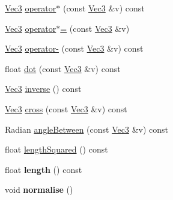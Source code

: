 \begin{DoxyCompactItemize}
\item 
\hyperlink{class_verdi_1_1_vec3}{\-Vec3} \hyperlink{class_verdi_1_1_vec3_aced0b24405adb8f7c75f7387adbd2e91}{operator$\ast$} (const \hyperlink{class_verdi_1_1_vec3}{\-Vec3} \&v) const 
\item 
\hyperlink{class_verdi_1_1_vec3}{\-Vec3} \hyperlink{class_verdi_1_1_vec3_a47b6e80a757cdb340b0e646aa9dd4636}{operator$\ast$=} (const \hyperlink{class_verdi_1_1_vec3}{\-Vec3} \&v)
\item 
\hyperlink{class_verdi_1_1_vec3}{\-Vec3} \hyperlink{class_verdi_1_1_vec3_a542c813d0357811c9cc78ace1f7754be}{operator-\/} (const \hyperlink{class_verdi_1_1_vec3}{\-Vec3} \&v) const 
\item 
float \hyperlink{class_verdi_1_1_vec3_a9704f2bf4f05943c9349806a3ef5cb28}{dot} (const \hyperlink{class_verdi_1_1_vec3}{\-Vec3} \&v) const 
\item 
\hyperlink{class_verdi_1_1_vec3}{\-Vec3} \hyperlink{class_verdi_1_1_vec3_a65d9be9038a82415adf94d84daea05fa}{inverse} () const 
\item 
\hyperlink{class_verdi_1_1_vec3}{\-Vec3} \hyperlink{class_verdi_1_1_vec3_a043f7130e4c642fc8cb922c49bfa8624}{cross} (const \hyperlink{class_verdi_1_1_vec3}{\-Vec3} \&v) const 
\item 
\-Radian \hyperlink{class_verdi_1_1_vec3_a95102441017d6df813e631d40951c2d8}{angle\-Between} (const \hyperlink{class_verdi_1_1_vec3}{\-Vec3} \&v) const 
\item 
float \hyperlink{class_verdi_1_1_vec3_ad0b20602d296ca1b994fb879cc2b0ab8}{length\-Squared} () const 
\item 
\hypertarget{class_verdi_1_1_vec3_aa9743884e05808196c05514efe47d888}{float {\bfseries length} () const }\label{class_verdi_1_1_vec3_aa9743884e05808196c05514efe47d888}

\item 
\hypertarget{class_verdi_1_1_vec3_a211452f879a007854501e095a58018a1}{void {\bfseries normalise} ()}\label{class_verdi_1_1_vec3_a211452f879a007854501e095a58018a1}

\end{DoxyCompactItemize}
